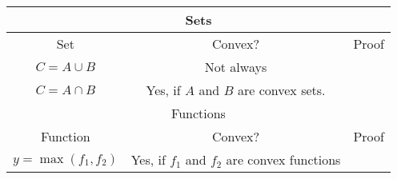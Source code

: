 \documentclass{article}
\begin{document}
\begin{table}
    \centering
    \begin{tabular}{||c | c | c||}
        \hline
        \multicolumn{3}{|c|}{Sets} \\
        \hline
        Set & Convex? & Proof \\ [0.5ex] 
        \hline\hline
        $C = A \cup B $ & Not always & \\
        \hline
        $C = A \cap B $ & Yes, if $A$ and $B$ are convex sets. & \\
        \hline
        \hline
        \multicolumn{3}{|c|}{Functions} \\
        \hline
        Function & Convex? & Proof \\ [0.5ex] 
        \hline\hline
        $y = \max(f_1, f_2)$ & Yes, if $f_1$ and $f_2$ are convex functions & \\
        \hline
    \end{tabular}
\end{table}
\end{document}
